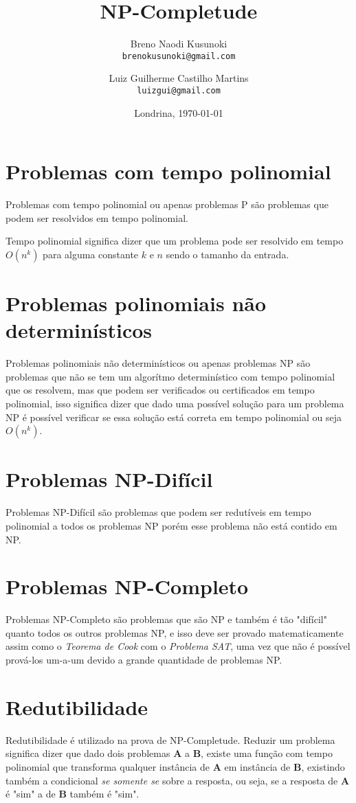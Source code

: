 \documentclass[12pt,a4papper]{article}
\title{NP-Completude}
\author{Breno Naodi Kusunoki \\
        \texttt{brenokusunoki@gmail.com}
        \and 
        Luiz Guilherme Castilho Martins \\
        \texttt{luizgui@gmail.com}
}
\date{Londrina, \today}
\begin{document}
\maketitle
\thispagestyle{empty}
\newpage

\tableofcontents
\thispagestyle{empty}
\newpage

\section{Problemas com tempo polinomial}
Problemas com tempo polinomial ou apenas problemas P são problemas que podem ser resolvidos em tempo polinomial.

Tempo polinomial significa dizer que um problema pode ser resolvido em tempo $O(n^k)$ para alguma constante $k$ e $n$ sendo o tamanho da entrada.

\section{Problemas polinomiais não determinísticos}
Problemas polinomiais não determinísticos ou apenas problemas NP são problemas que não se tem um algorítmo determinístico com tempo polinomial que os resolvem, mas que podem ser verificados ou certificados em tempo polinomial, isso significa dizer que dado uma possível solução para um problema NP é possível verificar se essa solução está correta em tempo polinomial ou seja $O(n^k)$.

\section{Problemas NP-Difícil}
Problemas NP-Difícil são problemas que podem ser redutíveis em tempo polinomial a todos os problemas NP porém esse problema não está contido em NP.

\section{Problemas NP-Completo}
Problemas NP-Completo são problemas que são NP e também é tão "difícil" quanto todos os outros problemas NP, e isso deve ser provado matematicamente assim como o \textit{Teorema de Cook} com o \textit{Problema SAT}, uma vez que não é possível prová-los um-a-um devido a grande quantidade de problemas NP.

\section{Redutibilidade}
Redutibilidade é utilizado na prova de NP-Completude. Reduzir um problema significa dizer que dado dois problemas \textbf{A} a \textbf{B}, existe uma função com tempo polinomial que transforma qualquer instância de \textbf{A} em instância de \textbf{B}, existindo também a condicional \textit{se somente se} sobre a resposta, ou seja, se a resposta de \textbf{A} é "sim" a de \textbf{B} também é "sim".
\end{document}
